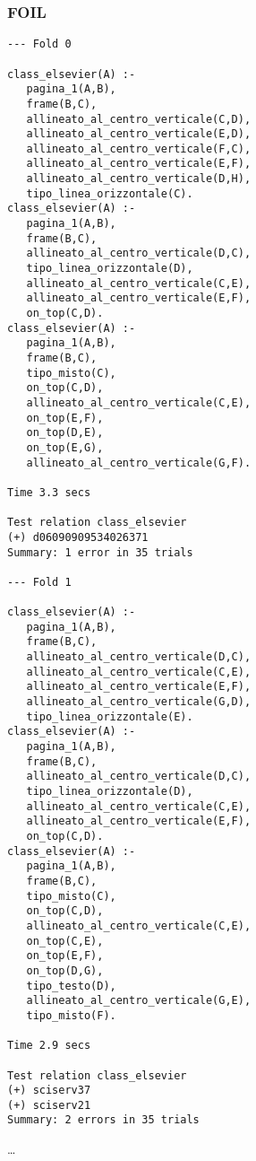 \subsubsection{FOIL}
\begin{verbatim}
--- Fold 0

class_elsevier(A) :- 
   pagina_1(A,B), 
   frame(B,C), 
   allineato_al_centro_verticale(C,D),
   allineato_al_centro_verticale(E,D), 
   allineato_al_centro_verticale(F,C), 
   allineato_al_centro_verticale(E,F), 
   allineato_al_centro_verticale(D,H), 
   tipo_linea_orizzontale(C).
class_elsevier(A) :- 
   pagina_1(A,B), 
   frame(B,C), 
   allineato_al_centro_verticale(D,C), 
   tipo_linea_orizzontale(D), 
   allineato_al_centro_verticale(C,E), 
   allineato_al_centro_verticale(E,F), 
   on_top(C,D).
class_elsevier(A) :- 
   pagina_1(A,B), 
   frame(B,C), 
   tipo_misto(C), 
   on_top(C,D), 
   allineato_al_centro_verticale(C,E), 
   on_top(E,F), 
   on_top(D,E), 
   on_top(E,G), 
   allineato_al_centro_verticale(G,F).

Time 3.3 secs

Test relation class_elsevier
(+)	d06090909534026371
Summary: 1 error in 35 trials

--- Fold 1

class_elsevier(A) :- 
   pagina_1(A,B), 
   frame(B,C), 
   allineato_al_centro_verticale(D,C),
   allineato_al_centro_verticale(C,E),
   allineato_al_centro_verticale(E,F),
   allineato_al_centro_verticale(G,D),
   tipo_linea_orizzontale(E).
class_elsevier(A) :- 
   pagina_1(A,B),
   frame(B,C),
   allineato_al_centro_verticale(D,C),
   tipo_linea_orizzontale(D),
   allineato_al_centro_verticale(C,E),
   allineato_al_centro_verticale(E,F),
   on_top(C,D).
class_elsevier(A) :- 
   pagina_1(A,B),
   frame(B,C),
   tipo_misto(C),
   on_top(C,D),
   allineato_al_centro_verticale(C,E),
   on_top(C,E),
   on_top(E,F),
   on_top(D,G),
   tipo_testo(D),
   allineato_al_centro_verticale(G,E),
   tipo_misto(F).

Time 2.9 secs

Test relation class_elsevier
(+)	sciserv37
(+)	sciserv21
Summary: 2 errors in 35 trials
\end{verbatim}
\dots
